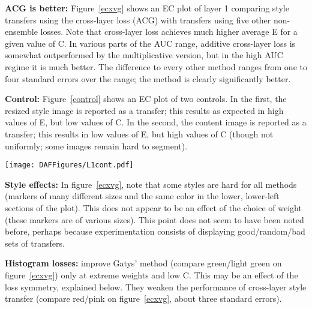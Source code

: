 \documentclass[runningheads]{llncs}
\begin{document}
{\bf ACG is better:} Figure~\ref{ecxvg} shows an EC plot of layer 1 comparing style transfers using the cross-layer loss (ACG)
with transfers using five other non-ensemble losses. Note that cross-layer loss achieves much higher average E for a
given value of C.  In various parts of the AUC range, additive cross-layer loss is somewhat outperformed by the
multiplicative version, but in the high AUC regime it is much better.  The difference to every other method ranges from
one to four standard errors over the range; the method is clearly significantly better.

{\bf Control:}  Figure~\ref{control} shows an EC plot of two controls.  In the first, the resized style image is reported as a
transfer; this results as expected in high values of E, but low values of C.  In the second, the content image is
reported as a transfer; this results in low values of E, but high values of C (though not uniformly; some images remain
hard to segment).  

\begin{figure*}[!htbp]
    \texttt{[image: DAFFigures/L1cont.pdf]}
\caption{\em An EC plot comparing two control methods.  One reports the resized style image as the transfer (small diamonds,
  yellow curve) and the other reports the content image as the transfer (large dots, blue curve).  Colors are keyed to
  style.  There is significant variance in E for the resized style image, an effect due to resizing.  However, the range
  of E's shows the size of the effect of resizing on E; on average, E slightly greater than 4, only slightly larger
than that achieved by the cross-layer loss. The curves are Loess regression curves of E against C, with shadowed regions showing one
  standard error bars up and down. Scale is the same as Figure \protect \ref{ecxvg}.   }
\label{control}
\end{figure*}

{\bf Style effects:} In figure~\ref{ecxvg}, note that some styles are hard for all methods (markers of many different
sizes and the same color in the lower, lower-left sections of the plot).  This does not appear to be an effect of the
choice of weight (these markers are of various sizes).  This point does not seem to have been noted before, perhaps
because experimentation consists of displaying good/random/bad sets of transfers.

{\bf Histogram losses:} improve Gatys' method (compare green/light green on
figure~\ref{ecxvg}) only at extreme weights and low C. This may be an effect of the loss symmetry, explained below.
They weaken the performance of cross-layer  style transfer (compare red/pink on figure~\ref{ecxvg}, about three standard errors).  
\end{document}
